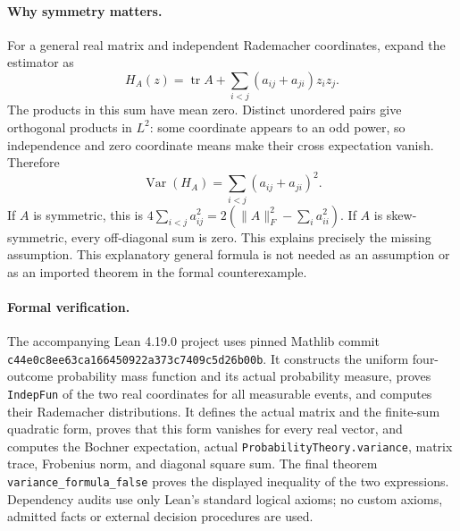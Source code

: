 \documentclass[11pt]{article}
\begin{document}
\paragraph{Why symmetry matters.}
For a general real matrix and independent Rademacher coordinates, expand the estimator as
\[
H_A(z)=\operatorname{tr}A+\sum_{i<j}(a_{ij}+a_{ji})z_i z_j.
\]
The products in this sum have mean zero. Distinct unordered pairs give orthogonal products in $L^2$: some coordinate appears to an odd power, so independence and zero coordinate means make their cross expectation vanish. Therefore
\[
\operatorname{Var}(H_A)=\sum_{i<j}(a_{ij}+a_{ji})^2.
\]
If $A$ is symmetric, this is $4\sum_{i<j}a_{ij}^2=2(\|A\|_F^2-\sum_i a_{ii}^2)$. If $A$ is skew-symmetric, every off-diagonal sum is zero. This explains precisely the missing assumption. This explanatory general formula is not needed as an assumption or as an imported theorem in the formal counterexample.

\paragraph{Formal verification.}
The accompanying Lean 4.19.0 project uses pinned Mathlib commit \texttt{c44e0c8ee63ca166450922a373c7409c5d26b00b}. It constructs the uniform four-outcome probability mass function and its actual probability measure, proves \texttt{IndepFun} of the two real coordinates for all measurable events, and computes their Rademacher distributions. It defines the actual matrix and the finite-sum quadratic form, proves that this form vanishes for every real vector, and computes the Bochner expectation, actual \texttt{ProbabilityTheory.variance}, matrix trace, Frobenius norm, and diagonal square sum. The final theorem \texttt{variance\_formula\_false} proves the displayed inequality of the two expressions. Dependency audits use only Lean's standard logical axioms; no custom axioms, admitted facts or external decision procedures are used.
\end{document}
